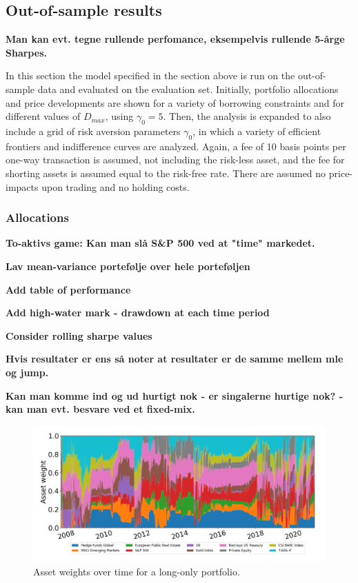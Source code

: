 \subsection{Out-of-sample results}

\textbf{Man kan evt. tegne rullende perfomance, eksempelvis rullende 5-årge Sharpes.}

In this section the model specified in the section above is run on the out-of-sample data and evaluated on the evaluation set. Initially, portfolio allocations and price developments are shown for a variety of borrowing constraints and for different values of $D_{max}$, using $\gamma_0=5$. Then, the analysis is expanded to also include a grid of risk aversion parameters $\gamma_0$, in which a variety of efficient frontiers and indifference curves are analyzed. Again, a fee of 10 basis points per one-way transaction is assumed, not including the risk-less asset, and the fee for shorting assets is assumed equal to the risk-free rate. There are assumed no price-impacts upon trading and no holding costs.

\subsubsection*{Allocations}

\textbf{To-aktivs game: Kan man slå S\&P 500 ved at "time" markedet.}

\textbf{Lav mean-variance portefølje over hele porteføljen}

\textbf{Add table of performance}

\textbf{Add high-water mark - drawdown at each time period}

\textbf{Consider rolling sharpe values}

\textbf{Hvis resultater er ens så noter at resultater er de samme mellem mle og jump.}

\textbf{Kan man komme ind og ud hurtigt nok - er singalerne hurtige nok? - kan man evt. besvare ved et fixed-mix.}



\begin{figure}[H]
    \centering
    \includegraphics[width=1\textwidth]{analysis/portfolio_exercise/images/mle/weights_lo.png}
    \caption[Asset weights over time for a long-only portfolio]{Asset weights over time for a long-only portfolio.}
    \label{fig:MPC_port_weights_lo}
\end{figure}


